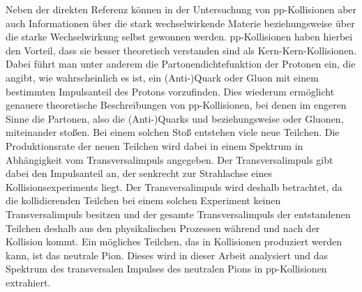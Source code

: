 Neben der direkten Referenz können in der Untersuchung von pp-Kollisionen aber auch Informationen über die stark wechselwirkende Materie beziehungsweise über die starke Wechselwirkung selbst gewonnen werden.
pp-Kollisionen haben hierbei den Vorteil, dass sie besser theoretisch verstanden sind als Kern-Kern-Kollisionen.
Dabei führt man unter anderem die  Partonendichtefunktion der Protonen ein, die angibt, wie wahrscheinlich es ist, ein (Anti-)Quark oder Gluon mit einem bestimmten Impulsanteil des Protons vorzufinden.
Dies wiederum ermöglicht genauere theoretische Beschreibungen von pp-Kollisionen, bei denen im engeren Sinne die Partonen, also die (Anti-)Quarks und beziehungsweise oder Gluonen, miteinander stoßen.
\newline
Bei einem solchen Stoß entstehen viele neue Teilchen.
Die Produktionsrate der neuen Teilchen wird dabei in einem Spektrum in Abhängigkeit vom Transversalimpuls angegeben.
Der Transversalimpuls gibt dabei den Impulsanteil an, der senkrecht zur Strahlachse eines Kollisionsexperiments liegt.
Der Transversalimpuls wird deshalb betrachtet, da die kollidierenden Teilchen bei einem solchen Experiment keinen Transversalimpuls besitzen und der gesamte Transversalimpuls der entstandenen Teilchen deshalb aus den physikalischen Prozessen während und nach der Kollision kommt.
\newline
Ein mögliches Teilchen, das in Kollisionen produziert werden kann, ist das neutrale Pion.
Dieses wird in dieser Arbeit analysiert und das Spektrum des transversalen Impulses des neutralen Pions in pp-Kollisionen extrahiert.